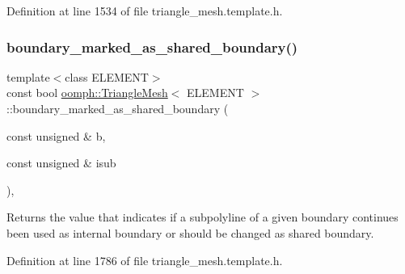 Definition at line 1534 of file triangle\+\_\+mesh.\+template.\+h.

\mbox{\label{classoomph_1_1TriangleMesh_ab627d8ade5dbc13df4478a9c9c44fbfa}} 
\subsubsection{\texorpdfstring{boundary\+\_\+marked\+\_\+as\+\_\+shared\+\_\+boundary()}{boundary\_marked\_as\_shared\_boundary()}}
{\footnotesize\ttfamily template$<$class E\+L\+E\+M\+E\+NT$>$ \\
const bool \hyperlink{classoomph_1_1TriangleMesh}{oomph\+::\+Triangle\+Mesh}$<$ E\+L\+E\+M\+E\+NT $>$\+::boundary\+\_\+marked\+\_\+as\+\_\+shared\+\_\+boundary (\begin{DoxyParamCaption}\item[{const unsigned \&}]{b,  }\item[{const unsigned \&}]{isub }\end{DoxyParamCaption})\hspace{0.3cm}{\ttfamily [inline]}, {\ttfamily [protected]}}



Returns the value that indicates if a subpolyline of a given boundary continues been used as internal boundary or should be changed as shared boundary. 



Definition at line 1786 of file triangle\+\_\+mesh.\+template.\+h.

\mbox{\label{classoomph_1_1TriangleMesh_a7afa9227b19c754d3d2284afb613e84c}} 
